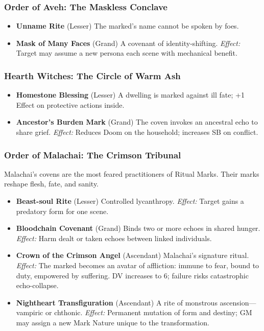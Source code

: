 \documentclass[11pt]{book}
\begin{document}
\subsubsection*{Order of Aveh: The Maskless Conclave}

\begin{itemize}[leftmargin=1.5em]
    \item \textbf{Unname Rite} (Lesser)  
    The marked's name cannot be spoken by foes.

    \item \textbf{Mask of Many Faces} (Grand)  
    A covenant of identity-shifting.  
    \emph{Effect:} Target may assume a new persona each scene with mechanical benefit.
\end{itemize}

\subsubsection*{Hearth Witches: The Circle of Warm Ash}

\begin{itemize}[leftmargin=1.5em]
    \item \textbf{Homestone Blessing} (Lesser)  
    A dwelling is marked against ill fate; +1 Effect on protective actions inside.

    \item \textbf{Ancestor's Burden Mark} (Grand)  
    The coven invokes an ancestral echo to share grief.  
    \emph{Effect:} Reduces Doom on the household; increases SB on conflict.
\end{itemize}

\subsubsection*{Order of Malachai: The Crimson Tribunal}

Malachai's covens are the most feared practitioners of Ritual Marks.  
Their marks reshape flesh, fate, and sanity.

\begin{itemize}[leftmargin=1.5em]
    \item \textbf{Beast-soul Rite} (Lesser)  
    Controlled lycanthropy.  
    \emph{Effect:} Target gains a predatory form for one scene.

    \item \textbf{Bloodchain Covenant} (Grand)  
    Binds two or more echoes in shared hunger.  
    \emph{Effect:} Harm dealt or taken echoes between linked individuals.

    \item \textbf{Crown of the Crimson Angel} (Ascendant)  
    Malachai's signature ritual.  
    \emph{Effect:} The marked becomes an avatar of affliction:  
    immune to fear, bound to duty, empowered by suffering.  
    DV increases to 6; failure risks catastrophic echo-collapse.

    \item \textbf{Nightheart Transfiguration} (Ascendant)  
    A rite of monstrous ascension---vampiric or chthonic.  
    \emph{Effect:} Permanent mutation of form and destiny;  
    GM may assign a new Mark Nature unique to the transformation.
\end{itemize}
\end{document}
